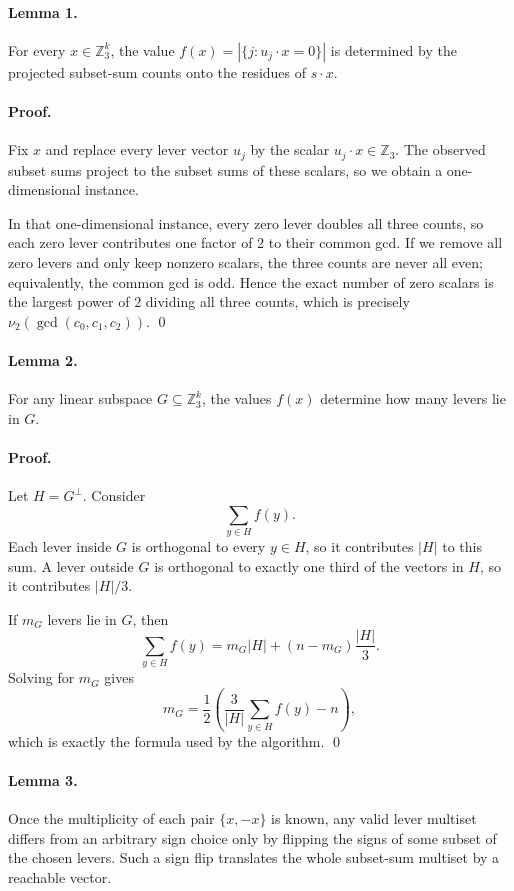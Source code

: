 \documentclass[11pt]{article}
\begin{document}
\paragraph{Lemma 1.}
For every $x \in \mathbb{Z}_3^k$, the value $f(x) = |\{j : u_j \cdot x = 0\}|$ is determined by the
projected subset-sum counts onto the residues of $s \cdot x$.

\paragraph{Proof.}
Fix $x$ and replace every lever vector $u_j$ by the scalar $u_j \cdot x \in \mathbb{Z}_3$. The observed
subset sums project to the subset sums of these scalars, so we obtain a one-dimensional instance.

In that one-dimensional instance, every zero lever doubles all three counts, so each zero lever
contributes one factor of $2$ to their common gcd. If we remove all zero levers and only keep
nonzero scalars, the three counts are never all even; equivalently, the common gcd is odd. Hence
the exact number of zero scalars is the largest power of $2$ dividing all three counts, which is
precisely $\nu_2(\gcd(c_0,c_1,c_2))$. \qed

\paragraph{Lemma 2.}
For any linear subspace $G \subseteq \mathbb{Z}_3^k$, the values $f(x)$ determine how many levers
lie in $G$.

\paragraph{Proof.}
Let $H = G^\perp$. Consider
\[
\sum_{y \in H} f(y).
\]
Each lever inside $G$ is orthogonal to every $y \in H$, so it contributes $|H|$ to this sum. A lever
outside $G$ is orthogonal to exactly one third of the vectors in $H$, so it contributes $|H|/3$.

If $m_G$ levers lie in $G$, then
\[
\sum_{y \in H} f(y) = m_G |H| + (n-m_G)\frac{|H|}{3}.
\]
Solving for $m_G$ gives
\[
m_G =
\frac{1}{2}\left(\frac{3}{|H|}\sum_{y \in H} f(y) - n\right),
\]
which is exactly the formula used by the algorithm. \qed

\paragraph{Lemma 3.}
Once the multiplicity of each pair $\{x,-x\}$ is known, any valid lever multiset differs from an
arbitrary sign choice only by flipping the signs of some subset of the chosen levers. Such a sign flip
translates the whole subset-sum multiset by a reachable vector.
\end{document}
